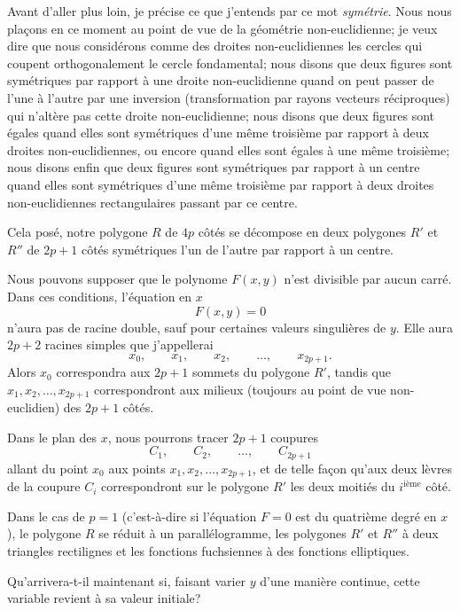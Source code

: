 \documentclass{article}
\begin{document}
Avant d'aller plus loin, je précise ce que j'entends par ce mot \emph{symétrie}. Nous nous plaçons en ce moment au point de vue de la géométrie non-euclidienne; je veux dire que nous considérons comme des droites non-euclidiennes les cercles qui coupent orthogonalement le cercle fondamental; nous disons que deux figures sont symétriques par rapport à une droite non-euclidienne quand on peut passer de l'une à l'autre par une inversion (transformation par rayons vecteurs réciproques) qui n'altère pas cette droite non-euclidienne; nous disons que deux figures sont égales quand elles sont symétriques d'une même troisième par rapport à deux droites non-euclidiennes, ou encore quand elles sont égales à une même troisième; nous disons enfin que deux figures sont symétriques par rapport à un centre quand elles sont symétriques d'une même troisième par rapport à deux droites non-euclidiennes rectangulaires passant par ce centre.

Cela posé, notre polygone $R$ de $4p$ côtés se décompose en deux polygones $R'$ et $R''$ de $2p + 1$ côtés symétriques l'un de l'autre par rapport à un centre.

Nous pouvons supposer que le polynome $F(x, y)$ n'est divisible par aucun carré. Dans ces conditions, l'équation en $x$
\[ F(x, y) = 0 \]
n'aura pas de racine double, sauf pour certaines valeurs singulières de $y$. Elle aura $2p + 2$ racines simples que j'appellerai
\[ x_{0}, \qquad x_{1}, \qquad x_{2}, \qquad \ldots, \qquad x_{2p+1}. \]
Alors $x_{0}$ correspondra aux $2p + 1$ sommets du polygone $R'$, tandis que $x_{1}, x_{2}, \ldots, x_{2p+1}$ correspondront aux milieux (toujours au point de vue non-euclidien) des $2p + 1$ côtés.

Dans le plan des $x$, nous pourrons tracer $2p + 1$ coupures
\[ C_{1}, \qquad C_{2}, \qquad \ldots, \qquad C_{2p+1} \]
allant du point $x_{0}$ aux points $x_{1}, x_{2}, \ldots, x_{2p+1}$, et de telle façon qu'aux deux lèvres de la coupure $C_{i}$ correspondront sur le polygone $R'$ les deux moitiés du $i^{\text{ième}}$ côté.


Dans le cas de $p = 1$ (c'est-à-dire si l'équation $F = 0$ est du quatrième degré en $x$), le polygone $R$ se réduit à un parallélogramme, les polygones $R'$ et $R''$ à deux triangles rectilignes et les fonctions fuchsiennes à des fonctions elliptiques.

Qu'arrivera-t-il maintenant si, faisant varier $y$ d'une manière continue, cette variable revient à sa valeur initiale?
\end{document}
